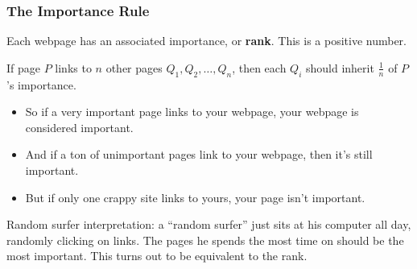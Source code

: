 
\begin{frame}
\frametitle{The Importance Rule}

Each webpage has an associated importance, or \textbf{rank}.  
This is a positive number.

\pause\smallskip
\begin{bluebox}{.7\linewidth}
  If page $P$ links to $n$ other pages $Q_1,Q_2,\ldots,Q_n$, then each $Q_i$
  should inherit $\frac 1n$ of $P$'s importance.
\end{bluebox}
\pause
\begin{itemize}
\item So if a very important page links to your webpage, your webpage is
  considered important.
  \pause
\item And if a ton of unimportant pages link to your webpage, then it's still
  important.
  \pause
\item But if only one crappy site links to yours, your page isn't important.
\end{itemize}

\pause\medskip
\alert{Random surfer interpretation:} 
a ``random surfer'' just sits at his computer all day, randomly clicking on
links.
\pause
The pages he spends the most time on should be the most important.
\pause
This turns out to be equivalent to the rank.

\end{frame}



